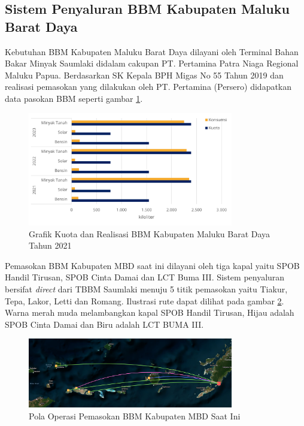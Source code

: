 \subsection{Sistem Penyaluran BBM Kabupaten Maluku Barat Daya}
\label{subsec:sistem-eksisting}

    Kebutuhan BBM Kabupaten Maluku Barat Daya dilayani oleh Terminal Bahan Bakar Minyak Saumlaki didalam cakupan PT. Pertamina Patra Niaga Regional Maluku Papua. Berdasarkan SK Kepala BPH Migas No 55 Tahun 2019 dan realisasi pemasokan yang dilakukan oleh PT. Pertamina (Persero) didapatkan data pasokan BBM seperti gambar \ref{fig:realisasi-bbm-mbd}.

\begin{figure}[htbp!]
    \centering
    \includegraphics[width=0.8\textwidth]{gambar/pasokan-konsumsi-BBM-MBD.png}
    \caption{Grafik Kuota dan Realisasi BBM Kabupaten Maluku Barat Daya Tahun 2021 \citep{Pertamina_2021}}
    \label{fig:realisasi-bbm-mbd}
\end{figure}

    Pemasokan BBM Kabupaten MBD saat ini dilayani oleh tiga kapal yaitu SPOB Handil Tirusan, SPOB Cinta Damai dan LCT Buma III.
    Sistem penyaluran bersifat \emph{direct} dari TBBM Saumlaki menuju 5 titik pemasokan yaitu Tiakur, Tepa, Lakor, Letti dan Romang. Ilustrasi rute dapat dilihat pada gambar \ref{fig:rute-old-bbm-mbd}. Warna merah muda melambangkan kapal SPOB Handil Tirusan, Hijau adalah SPOB Cinta Damai dan Biru adalah LCT BUMA III.

\begin{figure}[htbp!]
    \centering
    \includegraphics[width=0.8\textwidth]{gambar/rute-eksisting.png}
    \caption{Pola Operasi Pemasokan BBM Kabupaten MBD Saat Ini}
    \label{fig:rute-old-bbm-mbd}
\end{figure}

